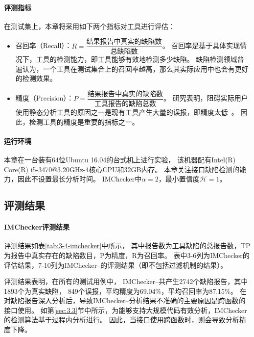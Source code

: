 \paragraph{评测指标}
在测试集上，本章将采用如下两个指标对工具进行评估：
\begin{itemize}
	\item 召回率（Recall）：$R = \dfrac{\text{结果报告中真实的缺陷数}}{\text{总缺陷数}}$。
	召回率是基于具体实现情况下，工具的检测能力，即工具能够有效地检测多少缺陷。
	缺陷检测领域普遍认为，一个工具在测试集合上的召回率越高，那么其实际应用中也会有更好的检测效果。
	\item 精度（Precision）：$P = \dfrac{\text{结果报告中真实的缺陷数}}{\text{工具报告的缺陷总数}}$。
	研究表明，阻碍实际用户使用静态分析工具的原因之一是现有工具产生大量的误报，即精度太低~\cite{10-acm-precision}。
	因此，检测工具的精度是重要的指标之一。
\end{itemize}

\paragraph{运行环境} 本章在一台装有64位Ubuntu 16.04的台式机上进行实验，
该机器配有Intel(R) Core(R) i5-3470@3.20GHz-4核心CPU和32GB内存。
本章关注接口缺陷检测的能力，因此不设置最长分析时间。
IMChecker中$\alpha=2$，最小置信度$ \mathcal{H}=1$。

\subsection{评测结果}


\paragraph{IMChecker评测结果}
评测结果如表\ref{tab:3-4-imchecker}中所示，
其中报告数为工具缺陷的总报告数，TP为报告中真实存在的缺陷数目，P为精度，R为召回率。
表中3-6列为IMChecker的评估结果，7-10列为IMChecker--的评测结果（即不包括过滤机制的结果）。

评测结果表明，在所有的测试用例中，
IMChecker--共产生2742个缺陷报告，其中1893个为真实缺陷，
849个误报，平均精度为69.04\%，平均召回率为87.15\%。
在对缺陷报告深入分析后，导致IMChecker--分析结果不准确的主要原因是跨函数的接口使用。
如第\ref{sec:3.3}节中所示，为能够支持大规模代码有效分析，IMChecker的检测算法基于过程内分析进行。
因此，当接口使用跨函数时，则会导致分析精度下降。

